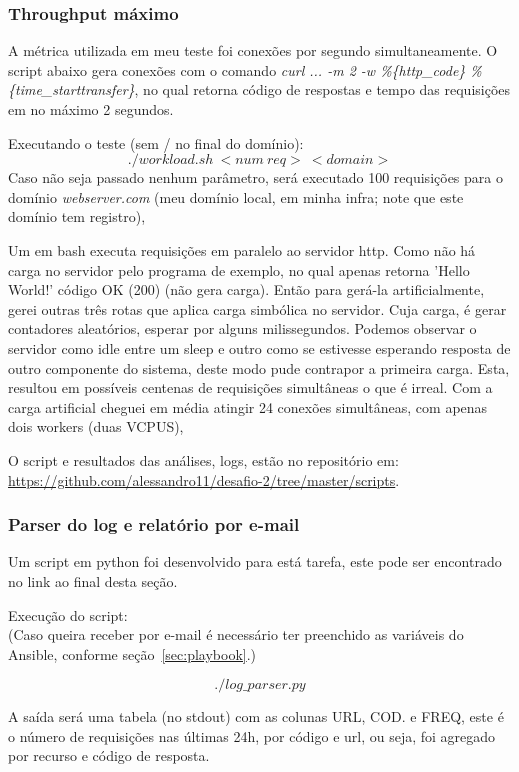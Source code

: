\subsubsection{Throughput máximo}
A métrica utilizada em meu teste foi conexões por segundo
simultaneamente. O script abaixo gera conexões com o comando
\emph{curl ... -m 2 -w \%\{http\_code\} \%\{time\_starttransfer\}}, no
qual retorna código de respostas e tempo das requisições em no máximo
2 segundos.

Executando o teste (sem / no final do domínio):
$$./workload.sh\ <num\ req>\ <domain>$$
Caso não seja passado nenhum parâmetro, será executado 100 requisições
para o domínio \emph{webserver.com} (meu domínio local, em minha infra; note
que este domínio tem registro),

Um
\label{script:carga}
em bash executa requisições em paralelo ao servidor http. Como não há
carga no servidor pelo programa de exemplo, no qual apenas retorna
'Hello World!' código OK (200) (não gera carga). Então para gerá-la
artificialmente, gerei outras três rotas que aplica carga simbólica
no servidor. Cuja carga, é gerar contadores aleatórios, esperar por
alguns milissegundos. Podemos observar o servidor como idle entre um
sleep e outro como se estivesse esperando resposta de outro componente
do sistema, deste modo pude contrapor a primeira carga. Esta, resultou
em possíveis centenas de requisições simultâneas o que é irreal. Com a
carga artificial cheguei em média atingir 24 conexões simultâneas, com
apenas dois workers (duas VCPUS),

O script e resultados das análises, logs, estão no repositório em:\\
\href{https://github.com/alessandro11/desafio-2/tree/master/scripts}{https://github.com/alessandro11/desafio-2/tree/master/scripts}.


\subsubsection{Parser do log e relatório por e-mail}
Um script em python foi desenvolvido para está tarefa, este pode ser
encontrado no link ao final desta seção.

Execução do script:\\
(Caso queira receber por e-mail é necessário ter preenchido as
variáveis do Ansible, conforme seção~\ref{sec:playbook}.)

$$./log\_parser.py$$

A saída será uma tabela (no stdout) com as colunas URL, COD. e FREQ, este é o
número de requisições nas últimas 24h, por código e url, ou seja, foi
agregado por recurso e código de resposta. 

